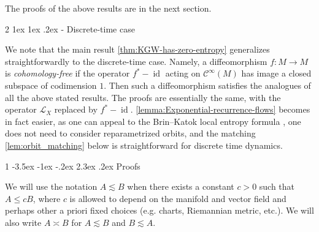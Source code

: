 \documentclass[11pt]{amsart}
\makeatletter
\renewcommand{\section}
{\@startsection{section}
				   {1}
				   {\z@}%
                                   {-3.5ex \@plus -1ex \@minus -.2ex}%
                                   {2.3ex \@plus.2ex}%
                                   {\centering \normalfont \Large \bfseries \sffamily}}%
\renewcommand{\subsection}
{\@startsection{subsection}
				     {2}
				     {\z@}%
                     {-3.25ex\@plus -1ex \@minus -.2ex}%
                     {1.5ex \@plus .2ex}%
                     {\normalfont \large \bfseries \sffamily}}%
\newcommand \cC {\mathcal{C}}
\newcommand \cL {\mathcal{L}}
\newcommand{\leqapprox}{\lesssim}
\theoremstyle{mytheoremstyle}
\theoremstyle{mydefinitionstyle}
\theoremstyle{mytheoremstyle}
\numberwithin{equation}{section}
\renewcommand{\subsection}
{\@startsection{subsection}
                     {2}
                     {\z@}%
                     {1ex \@plus1ex \@minus.2ex}%
                     {-\fontdimen 2\font }
                     {\normalfont\normalsize\bfseries}}
\theoremstyle{mydefinitionstyle}
\makeatother
\begin{document}
The proofs of the above results are in the next section.


\subsection{Discrete-time case}
  \label{ssec:discrete_time_case}

We note that the main result \autoref{thm:KGW-has-zero-entropy} generalizes straightforwardly to the discrete-time case.
Namely, a diffeomorphism $f\colon M\to M$ is \emph{cohomology-free} if the operator $f^*-\operatorname{id}$ acting on $\cC^\infty(M)$ has image a closed subspace of codimension $1$.
Then such a diffeomorphism satisfies the analogues of all the above stated results.
The proofs are essentially the same, with the operator $\cL_X$ replaced by $f^*-\operatorname{id}$.
\autoref{lemma:Exponential-recurrence-flows} becomes in fact easier, as one can appeal to the Brin--Katok local entropy formula \cite{BrinKatok1983_On-local-entropy}, one does not need to consider reparametrized orbits, and the matching \autoref{lem:orbit_matching} below is straightforward for discrete time dynamics.








					\section{Proofs}
					\label{sec:Proofs}

We will use the notation $A\leqapprox B$ when there exists a constant $c>0$ such that $A\leq cB$, where $c$ is allowed to depend on the manifold and vector field and perhaps other a priori fixed choices (e.g. charts, Riemannian metric, etc.).
We will also write $A\asymp B$ for $A\leqapprox B$ and $B\leqapprox A$.
\end{document}
